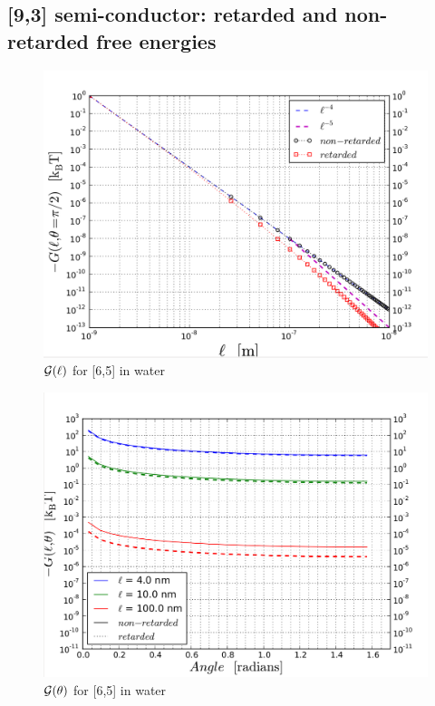 \documentclass[a4paper]{article}
\begin{document}
\begin{center}
\subsection{[9,3] semi-conductor: retarded and non-retarded free energies}
\begin{figure}[t!]
\begin{center}
\includegraphics[width=1.5\textwidth]{plots/siber_comp_G_vs_l_sw_r_nr_65.png}
\hskip 43pt
\caption{$\cal{G}(\ell)$ for [6,5] in water}
\label{eiz65}
\end{center}
\end{figure} 

\begin{figure}[t!]
\begin{center}
\includegraphics[width=1.5\textwidth]{plots/siber_comp_G_vs_theta_65.png}
\hskip 43pt
\caption{$\cal{G}(\theta)$ for [6,5] in water}
\label{eiz65}
\end{center}
\end{figure} 

\end{center}
\end{document}
